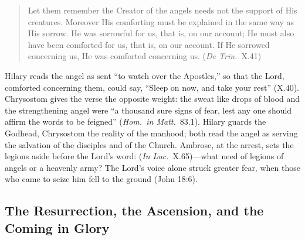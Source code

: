 \begin{quote}
Let them remember the Creator of the angels needs not the support of His
creatures. Moreover His comforting must be explained in the same way as His
sorrow. He was sorrowful for us, that is, on our account; He must also have
been comforted for us, that is, on our account. If He sorrowed concerning
us, He was comforted concerning us. (\emph{De Trin.}\ X.41)
\end{quote}

\noindent Hilary reads the angel as sent ``to watch over the Apostles,'' so
that the Lord, comforted concerning them, could say, ``Sleep on now, and
take your rest'' (X.40). Chrysostom gives the verse the opposite weight: the
sweat like drops of blood and the strengthening angel were ``a thousand sure
signs of fear, lest any one should affirm the words to be feigned''
(\emph{Hom.\ in Matt.}\ 83.1). Hilary guards the Godhead, Chrysostom the
reality of the manhood; both read the angel as serving the salvation of the
disciples and of the Church. Ambrose, at the arrest, sets the legions aside
before the Lord's word:  (\emph{In Luc.}\ X.65)---what need
of legions of angels or a heavenly army? The Lord's voice alone struck
greater fear, when those who came to seize him fell to the ground (John
18:6).

\sectionguard
\subsection{The Resurrection, the Ascension, and the Coming in Glory}\label{sec:cm-glory}

